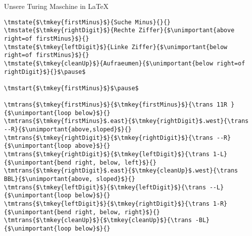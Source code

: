
\newcommand{\unimportant}[1]{\textcolor{dunkelgrau!30}{#1}}
\newcommand{\tmkey}[1]{\textcolor{emorot}{#1}}

\begin{frame}[fragile]{Unsere Turing Maschine in \LaTeX}

\begin{lstlisting}[]
\tmstate{$\tmkey{firstMinus}$}{Suche Minus}{}{}
\tmstate{$\tmkey{rightDigit}$}{Rechte Ziffer}{$\unimportant{above right=of firstMinus}$}{}
\tmstate{$\tmkey{leftDigit}$}{Linke Ziffer}{$\unimportant{below right=of firstMinus}$}{}
\tmstate{$\tmkey{cleanUp}$}{Aufraeumen}{$\unimportant{below right=of rightDigit}$}{}$\pause$

\tmstart{$\tmkey{firstMinus}$}$\pause$

\tmtrans{$\tmkey{firstMinus}$}{$\tmkey{firstMinus}$}{\trans 11R }{$\unimportant{loop below}$}{}
\tmtrans{$\tmkey{firstMinus}$.east}{$\tmkey{rightDigit}$.west}{\trans --R}{$\unimportant{above,sloped}$}{}
\tmtrans{$\tmkey{rightDigit}$}{$\tmkey{rightDigit}$}{\trans --R}{$\unimportant{loop above}$}{}
\tmtrans{$\tmkey{rightDigit}$}{$\tmkey{leftDigit}$}{\trans 1-L}{$\unimportant{bend right, below, left}$}{}
\tmtrans{$\tmkey{rightDigit}$.east}{$\tmkey{cleanUp}$.west}{\trans BBL}{$\unimportant{above, sloped}$}{}
\tmtrans{$\tmkey{leftDigit}$}{$\tmkey{leftDigit}$}{\trans --L}{$\unimportant{loop below}$}{}
\tmtrans{$\tmkey{leftDigit}$}{$\tmkey{rightDigit}$}{\trans 1-R}{$\unimportant{bend right, below, right}$}{}
\tmtrans{$\tmkey{cleanUp}$}{$\tmkey{cleanUp}$}{\trans -BL}{$\unimportant{loop below}$}{}
\end{lstlisting}
\end{frame}
